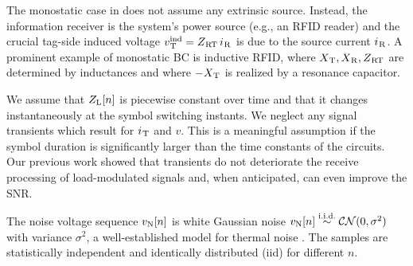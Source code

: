 The monostatic case in  does not assume any extrinsic source. Instead, the information receiver is the system's power source (e.g., an RFID reader) and the crucial tag-side induced voltage $v^\mathrm{ind}_{\hspace{.2mm}\mathrm{T}} = Z_{\hspace{.2mm}\mathrm{RT}}\, i_{\hspace{.2mm}\mathrm{R}}$ is due to the source current $i_{\hspace{.2mm}\mathrm{R}}$. A prominent example of monostatic BC is inductive RFID, where $X_{\hspace{.2mm}\mathrm{T}}, X_{\hspace{.2mm}\mathrm{R}}, Z_{\hspace{.2mm}\mathrm{RT}}$ are determined by inductances and where $-X_{\hspace{.2mm}\mathrm{T}}$ is realized by a resonance capacitor.


We assume that $Z_\mathrm{L}[n]$ is piecewise constant over time and that it changes instantaneously at the symbol switching instants. We neglect any signal transients which result for $i_{\hspace{.2mm}\mathrm{T}}$ and $v$. This is a meaningful assumption if the symbol duration is significantly larger than the time constants of the circuits. Our previous work \cite[Appendix~E]{Dumphart2020} showed that transients do not deteriorate the receive processing of load-modulated signals and, when anticipated, can even improve the SNR.

The noise voltage sequence $v_\mathrm{N}[n]$ is white Gaussian noise $v_\mathrm{N}[n] \overset{\text{i.i.d.}}{\sim} \mathcal{CN}(0,\sigma^2)$ with variance $\sigma^2$, a well-established model for thermal noise \cite{Tse2005}. The samples are statistically independent and identically distributed (iid) for different $n$.


